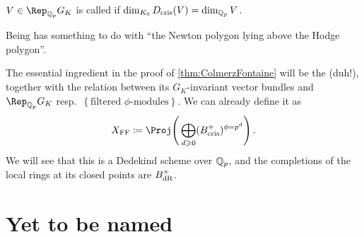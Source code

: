 \documentclass[a4paper, 10pt, oneside, DIV=9, chapterprefix=true, numbers=enddot,bibliography=totoc]{scrbook}
\begin{document}
\begin{rem}
	\begin{numerate}
		\item $V\in \Rep_{\IQ_p}G_K$ is called  if $\dim_{K_0}D_{\mathrm{cris}}(V)=\dim_{\mathbb{Q}_p}V$.
		\item Being  has something to do with \enquote{the Newton polygon lying above the Hodge polygon}.
		\item The essential ingredient in the proof of \cref{thm:ColmerzFontaine} will be the  (duh!), together with the relation between its $G_K$-invariant vector bundles and $\Rep_{\IQ_p}G_K$ resp.\ $\left\{\text{filtered }\phi\text{-modules}\right\}$. We can already define it as
		\begin{equation*}
			X_\FFC\coloneqq \Proj\Bigg(\bigoplus_{d\geq 0}(B_\cris^+)^{\phi=p^d}\Bigg)\,.
		\end{equation*}
		We will see that this is a Dedekind scheme over $\mathbb{Q}_p$, and the completions of the local rings at its closed points are $B_{\mathrm{dR}}^+$.
	\end{numerate}
\end{rem}


\mainmatter{}
\renewcommand{\thedummy}{\thesection.\arabic{dummy}}

\chapter{Yet to be named}
\end{document}
